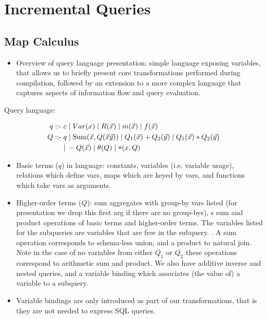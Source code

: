 \section{Incremental Queries}

\subsection{Map Calculus}

\def\calcsum{\mbox{Sum}}
\def\calceq{\mbox{{\tt =}}}
\def\calcgt{\mbox{{\tt >}}}
\def\calcgte{\mbox{{\tt >=}}}
\def\calclte{\mbox{{\tt <=}}}

\def \q{q}
\def \qq{Q}
\def \qqa{Q_1}
\def \qqb{Q_2}
\def \v#1{\mbox{#1}}
\def \vv#1{\mbox{{\tiny #1}}}

\begin{itemize}
  \item Overview of query language presentation: simple language exposing
  variables, that allows us to briefly present core transformations performed
  during compilation, followed by an extension to a more complex language that
  captures aspects of information flow and query evaluation.
\end{itemize}

\noindent Query language:

\begin{align*} 
\q \; \mbox{::-} &
  \;    c \;|\; Var(x)
  \;|\; R(\vec{x}) \;|\; m(\vec{x}) \;|\; f(\vec{x})
\\
\comment{
& \;|\; \theta(x,y)   \;|\; \theta_c(x)
  \;|\; \calceq(\q,y) \;|\; \calceq(x,y)
\\
}
\qq \; \mbox{::-} & \; \q \;|\; \calcsum(\vec{x}, \qq(\vec{x}\vec{y}))
    \;|\; \qqa(\vec{x}) + \qqb(\vec{y}) \;|\; \qqa(\vec{x}) * \qqb({\vec{y}}) \\
&   \;|\; -\qq(\vec{x}) \;|\; \theta(\qq) \;|\; \calceq(x,\qq)
\end{align*}

\begin{itemize}
  \item Basic terms ($q$) in language: constants, variables (i.e. variable
  usage), relations which define vars, maps which are keyed by vars, and
  functions which take vars as arguments.
  \item Higher-order terms ($Q$): sum aggregates with group-by vars
  listed (for presentation we drop this first arg if there are no group-bys), s
  sum and product operations of basic terms and higher-order terms. The
  variables listed for the subqueries are variables that are free in the
  subquery. . A sum operation corresponds to schema-less union, and a product to
  natural join. Note in the case of no variables from either $\qqa$ or $\qqb$
  these operations correspond to arithmetic sum and product. We also have
  additive inverse and nested queries, and a variable binding which associates
  (the value of) a variable to a subquery.
  \item Variable bindings are only introduced as part of our transformations,
  that is they are not needed to express SQL queries.
\end{itemize}

